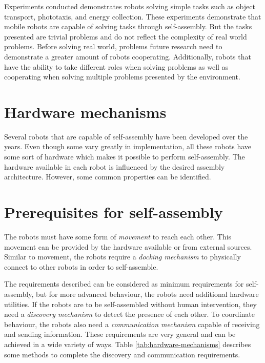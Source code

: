 Experiments conducted demonstrates robots solving simple tasks such as object transport\cite{gro_autonomous_2006}, phototaxis\cite{trianni_evolving_2004}, and energy collection\cite{montanier_adaptive_2014}\cite{weel_emergence_2012}.
These experiments demonstrate that mobile robots are capable of solving tasks through self-assembly.
But the tasks presented are trivial problems and do not reflect the complexity of real world problems.
Before solving real world, problems future research need to demonstrate a greater amount of robots cooperating.
Additionally, robots that have the ability to take different roles when solving problems as well as cooperating when solving multiple problems presented by the environment.

\section{Hardware mechanisms}
\label{sec:hardware}
Several robots that are capable of self-assembly have been developed over the years.
Even though some vary greatly in implementation, all these robots have some sort of hardware which makes it possible to perform self-assembly.
The hardware available in each robot is influenced by the desired assembly architecture.
However, some common properties can be identified.  

\section*{Prerequisites for self-assembly}
The robots must have some form of \emph{movement} to reach each other.
This movement can be provided by the hardware available or from external sources.
Similar to movement, the robots require a \emph{docking mechanism} to physically connect to other robots in order to self-assemble.

The requirements described can be considered as minimum requirements for self-assembly, but for more advanced behaviour, the robots need additional hardware utilities.
If the robots are to be self-assembled without human intervention, they need a \emph{discovery mechanism} to detect the presence of each other.
To coordinate behaviour, the robots also need a \emph{communication mechanism} capable of receiving and sending information.
These requirements are very general and can be achieved in a wide variety of ways. Table \ref{tab:hardware-mechanisms} describes some methods to complete the discovery and communication requirements.

